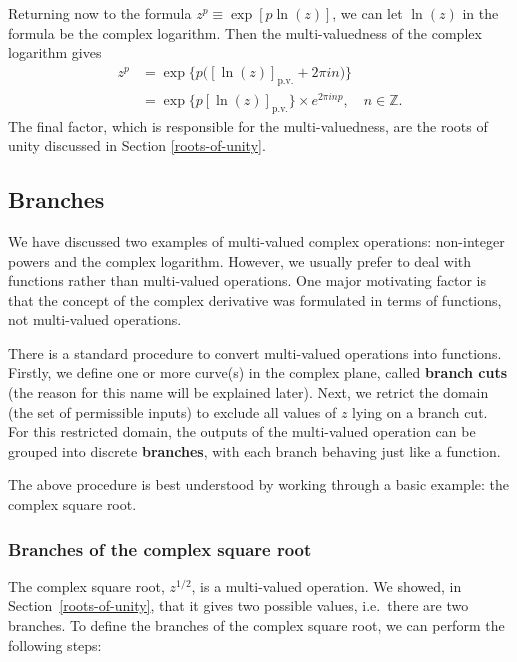 \documentclass[10pt,a4paper]{article}
\begin{document}
Returning now to the formula $z^p \equiv \exp\left[p\ln(z)\right]$, we
can let $\ln(z)$ in the formula be the complex logarithm. Then the
multi-valuedness of the complex logarithm gives
\begin{align}
  z^p &= \exp\Big\{p\big([\ln(z)]_{\mathrm{p.v.}} + 2\pi i n\big)\Big\}\\
  &= \exp\Big\{p[\ln(z)]_{\mathrm{p.v.}}\Big\} \times e^{2\pi i np}, \quad n \in \mathbb{Z}.
\end{align}
The final factor, which is responsible for the multi-valuedness, are
the roots of unity discussed in Section \ref{roots-of-unity}.

\subsection{Branches}\label{branches}

We have discussed two examples of multi-valued complex operations:
non-integer powers and the complex logarithm.  However, we usually
prefer to deal with functions rather than multi-valued operations. One
major motivating factor is that the concept of the complex derivative
was formulated in terms of functions, not multi-valued operations.

There is a standard procedure to convert multi-valued operations into
functions. Firstly, we define one or more curve(s) in the complex plane,
called \textbf{branch cuts} (the reason for this name will be explained
later). Next, we retrict the domain (the set of permissible inputs) to
exclude all values of $z$ lying on a branch cut. For this restricted
domain, the outputs of the multi-valued operation can be grouped into
discrete \textbf{branches}, with each branch behaving just like a
function.

The above procedure is best understood by working through a basic
example: the complex square root.

\subsubsection{Branches of the complex square root}
\label{branches-of-the-complex-square-root}

The complex square root, $z^{1/2}$, is a multi-valued operation. We
showed, in Section~\ref{roots-of-unity}, that it gives two possible
values, i.e.~there are two branches. To define the branches of the
complex square root, we can perform the following steps:
\end{document}
